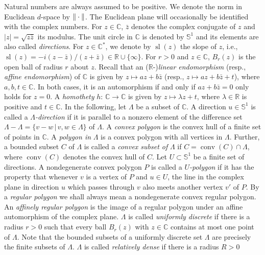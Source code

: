 \documentclass[a4paper]{amsart}
\theoremstyle{definition}
\numberwithin{equation}{section}
\numberwithin{theorem}{section}
\begin{document}
Natural numbers are always assumed to be positive. We denote the norm in Euclidean $d$-space by $\Arrowvert \cdot \Arrowvert$. The Euclidean plane will occasionally be
identified with the complex numbers. For $z\in{\mathbb{C}}$, $\bar{z}$ denotes the 
complex conjugate of $z$ and $|z|=\sqrt{z\bar{z}}$ its modulus. The unit circle in ${\mathbb{C}}$ is
denoted by $\mathbb{S}^{1}$ and its elements are also called
{\em directions}. For $z\in {\mathbb{C}}^*$, we denote
by $\operatorname{sl}(z)$ the slope of $z$, i.e., $\operatorname{sl}(z)=-i(z-\bar{z})/(z+\bar{z})\in
\mathbb{R}\cup\{\infty\}$. For $r>0$ and $z\in{\mathbb{C}}$,
$B_{r}(z)$ is the open ball of radius $r$ about $z$. Recall that an
(${\mathbb{R}}$-){\em linear endomorphism} (resp., {\em affine endomorphism})
 of ${\mathbb{C}}$ is given
by $z \mapsto az+b\bar{z}$ (resp., $z \mapsto az+b\bar{z}+t$), where $a,b,t\in{\mathbb{C}}$. In both cases,
it is an automorphism if and only if $az+b\bar{z}=0$ only holds for $z=0$. A {\em homothety} $h\!:\, {\mathbb{C}} \rightarrow
{\mathbb{C}}$ is given by $z \mapsto \lambda z + t$, where
$\lambda \in {\mathbb{R}}$ is positive and $t\in {\mathbb{C}}$. In the following, let
$\varLambda$ be a subset of ${\mathbb{C}}$. A direction
$u\in\mathbb{S}^{1}$ is called a $\varLambda${\em-direction} if it is
parallel to a nonzero element of the difference set
$\varLambda-\varLambda=\{v-w\,|\,v,w\in\varLambda\}$ of $\varLambda$. A {\em convex polygon} is the convex hull of a finite set of points in ${\mathbb{C}}$. A {\em polygon in} $\varLambda$ is a convex polygon with all vertices in $\varLambda$. Further, a bounded subset $C$ of $\varLambda$ is called a {\em convex subset of} $\varLambda$ if $C =
\operatorname{conv}(C)\cap \varLambda$, where $\operatorname{conv}(C)$
denotes the convex hull of $C$. Let $U\subset \mathbb{S}^{1}$ be
a finite set of directions. A nondegenerate convex polygon $P$ is
called a {\em $U$-polygon} if it has the property that whenever $v$ is
a vertex of $P$ and $u\in U$, the line in the complex plane in direction $u$
which passes through $v$ also meets another vertex $v'$ of $P$. By a
{\em regular polygon} we shall always mean a nondegenerate convex regular polygon. An
{\em affinely regular polygon} is the image of a
regular polygon under an affine automorphism of the complex plane. $\varLambda$ is called {\em uniformly discrete} if there is a radius
$r>0$ such that every ball $B_{r}(z)$ with $z\in{\mathbb{C}}$ contains at most one point of
  $\varLambda$. Note that the bounded 
  subsets of a uniformly discrete set $\varLambda$ are precisely the
  finite subsets of $\varLambda$. $\varLambda$ is called {\em relatively dense} if there is a radius $R>0$
\end{document}
